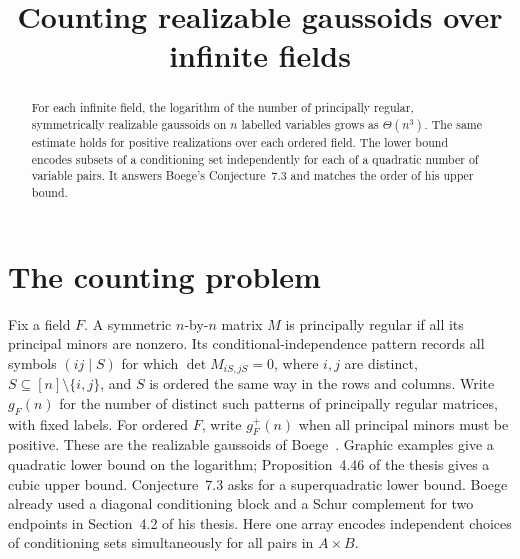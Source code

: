 \documentclass[11pt,a4paper]{amsart}
\title{Counting realizable gaussoids over infinite fields}
\date{}
\begin{document}
\begin{abstract}
For each infinite field, the logarithm of the number of principally regular, symmetrically realizable gaussoids on $n$ labelled variables grows as $\Theta(n^3)$. The same estimate holds for positive realizations over each ordered field. The lower bound encodes subsets of a conditioning set independently for each of a quadratic number of variable pairs. It answers Boege's Conjecture~7.3 and matches the order of his upper bound.
\end{abstract}
\maketitle
\section{The counting problem}
Fix a field $F$. A symmetric $n$-by-$n$ matrix $M$ is principally regular if all its principal minors are nonzero. Its conditional-independence pattern records all symbols $(ij\mid S)$ for which $\det M_{iS,jS}=0$, where $i,j$ are distinct, $S\subseteq[n]\setminus\{i,j\}$, and $S$ is ordered the same way in the rows and columns. Write $g_F(n)$ for the number of distinct such patterns of principally regular matrices, with fixed labels. For ordered $F$, write $g_F^+(n)$ when all principal minors must be positive. These are the realizable gaussoids of Boege~\cite{boege}. Graphic examples give a quadratic lower bound on the logarithm; Proposition~4.46 of the thesis gives a cubic upper bound. Conjecture~7.3 asks for a superquadratic lower bound. Boege already used a diagonal conditioning block and a Schur complement for two endpoints in Section~4.2 of his thesis. Here one array encodes independent choices of conditioning sets simultaneously for all pairs in $A\times B$.
\end{document}
